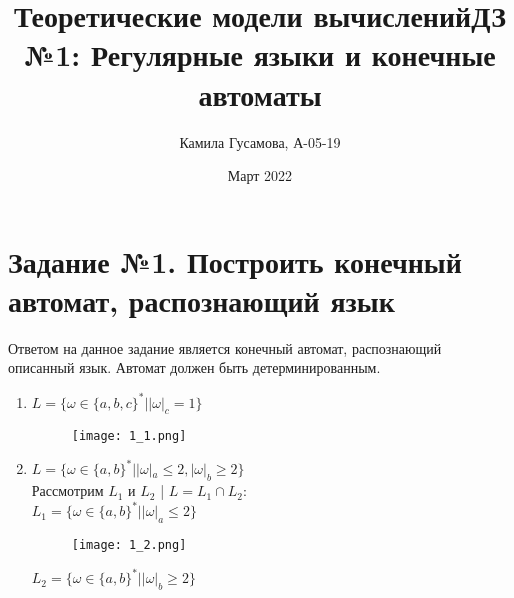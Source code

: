 \documentclass[12pt, a4paper]{article}
\title{Теоретические модели вычислений}
\title{ДЗ №1: Регулярные языки и конечные автоматы}
\author{Камила Гусамова, А-05-19}
\date{Март 2022}
\begin{document}
\maketitle


\section{Задание №1. Построить конечный автомат, распознающий язык}%
Ответом на данное задание является конечный автомат, распознающий описанный язык. Автомат должен быть детерминированным.
\begin{enumerate}
    \item \(L=\{\omega\in\{a,b,c\}^* | |\omega|_c = 1 \} \)
    
\begin{comment}
digraph {
    rankdir="LR"
    "" [shape=point]
    q1 [shape=circle]
    q2 [shape=doublecircle]
    
    "" -> q1
    q1 -> q1 [label="a,b"]
    q1 -> q2 [label="c"]
    q2 -> q2 [label="a,b"]
}
\end{comment}

    \begin{figure}[H]
        \centering
        \texttt{[image: 1\_1.png]}
    \end{figure}
    \item \(L=\{\omega\in\{a,b\}^* | |\omega|_a \leq 2, |\omega|_b \geq 2 \} \)
\\Рассмотрим \(L_1\) и \(L_2\) | \(L=L_1 \cap L_2\):
\\\(L_1=\{\omega\in\{a,b\}^* | |\omega|_a \leq 2 \} \)
\begin{comment}
digraph {
    rankdir="LR"
    "" [shape=point]
    q1 [shape=doublecircle]
    q2 [shape=doublecircle]
    q3 [shape=doublecircle]
    
    "" -> q1
    q1 -> q1 [label="b"]
    q1 -> q2 [label="a"]
    q2 -> q2 [label="b"]
    q2 -> q3 [label="a"]
    q3 -> q3 [label="b"]
}
\end{comment}

    \begin{figure}[H]
        \centering
        \texttt{[image: 1\_2.png]}
    \end{figure}
    
\(L_2=\{\omega\in\{a,b\}^* | |\omega|_b \geq 2 \} \)


\end{enumerate}
\end{document}
